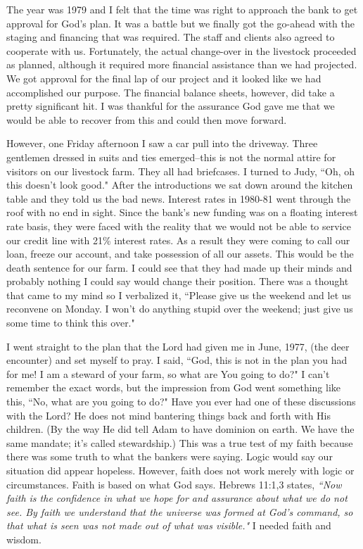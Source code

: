\documentclass[oneside,12pt]{book}
\begin{document}
The year was 1979 and I felt that the time was right to approach the bank to get approval for God's plan. It was a battle but we finally got the go-ahead with the staging and financing that was required. The staff and clients also agreed to cooperate with us. Fortunately, the actual change-over in the livestock proceeded as planned, although it required more financial assistance than we had projected. We got approval for the final lap of our project and it looked like we had accomplished our purpose. The financial balance sheets, however, did take a pretty significant hit. I was thankful for the assurance God gave me that we would be able to recover from this and could then move forward. 

However, one Friday afternoon I saw a car pull into the driveway. Three gentlemen dressed in suits and ties emerged--this is not the normal attire for visitors on our livestock farm. They all had briefcases. I turned to Judy, ``Oh, oh this doesn't look good." After the introductions we sat down around the kitchen table and they told us the bad news. Interest rates in 1980-81 went through the roof with no end in sight. Since the bank's new funding was on a floating interest rate basis, they were faced with the reality that we would not be able to service our credit line with 21\% interest rates. As a result they were coming to call our loan, freeze our account, and take possession of all our assets. This would be the death sentence for our farm. I could see that they had made up their minds and probably nothing I could say would change their position. There was a thought that came to my mind so I verbalized it, ``Please give us the weekend and let us reconvene on Monday. I won't do anything stupid over the weekend; just give us some time to think this over."

I went straight to the plan that the Lord had given me in June, 1977, (the deer encounter) and set myself to pray. I said, ``God, this is not in the plan you had for me!  I am a steward of your farm, so what are You going to do?" I can't remember the exact words, but the impression from God went something like this, ``No, what are you going to do?" Have you ever had one of these discussions with the Lord? He does not mind bantering things back and forth with His children. (By the way He did tell Adam to have dominion on earth. We have the same mandate; it's called stewardship.) This was a true test of my faith because there was some truth to what the bankers were saying. Logic would say our situation did appear hopeless. However, faith does not work merely with logic or circumstances. Faith is based on what God says. Hebrews 11:1,3 states, \textit{``Now faith is the confidence in what we hope for and assurance about what we do not see. By faith we understand that the universe was formed at God's command, so that what is seen was not made out of what was visible."} I needed faith and wisdom. 
\end{document}
